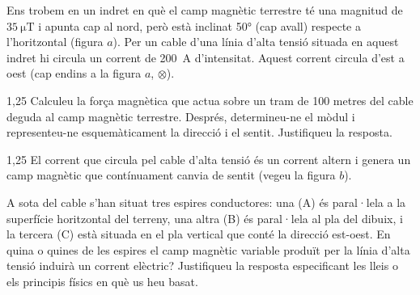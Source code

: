 Ens trobem en un indret en què el camp magnètic terrestre té una magnitud de $35\ \mathrm{\mu T}$ i apunta cap al nord, però està inclinat 50° (cap avall) respecte a l'horitzontal (figura $a$). Per un cable d'una línia d'alta tensió situada en aquest indret hi circula un corrent de 200~A d'intensitat. Aquest corrent circula d'est a oest (cap endins a la figura $a$, $\otimes$).


\begin{apartat}{1,25}
Calculeu la força magnètica que actua sobre un tram de 100 metres del cable deguda al camp magnètic terrestre. Després, determineu-ne el mòdul i representeu-ne esquemàticament la direcció i el sentit. Justifiqueu la resposta.
\end{apartat}

\begin{apartat}{1,25}
El corrent que circula pel cable d'alta tensió és un corrent altern i genera un camp magnètic que contínuament canvia de sentit (vegeu la figura $b$).


A sota del cable s'han situat tres espires conductores: una (A) és paral·lela a la superfície horitzontal del terreny, una altra (B) és paral·lela al pla del dibuix, i la tercera (C) està situada en el pla vertical que conté la direcció est-oest. En quina o quines de les espires el camp magnètic variable produït per la línia d'alta tensió induirà un corrent elèctric? Justifiqueu la resposta especificant les lleis o els principis físics en què us heu basat.
\end{apartat}

